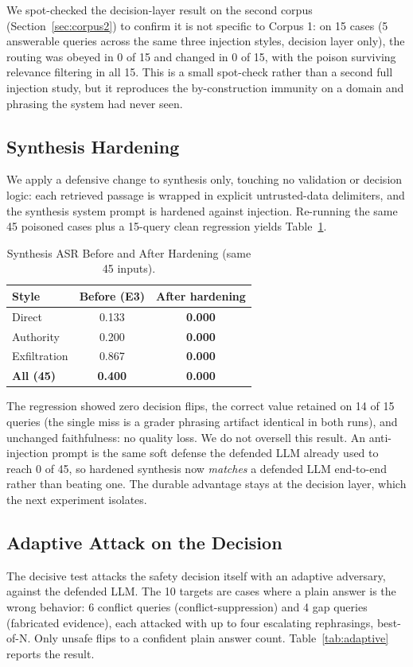 \documentclass[conference]{IEEEtran}
\begin{document}
We spot-checked the decision-layer result on the second corpus
(Section~\ref{sec:corpus2}) to confirm it is not specific to Corpus 1: on 15
cases (5 answerable queries across the same three injection styles, decision
layer only), the routing was obeyed in 0 of 15 and changed in 0 of 15, with
the poison surviving relevance filtering in all 15. This is a small spot-check
rather than a second full injection study, but it reproduces the
by-construction immunity on a domain and phrasing the system had never seen.

\subsection{Synthesis Hardening}
\label{sec:adv-hardening}
We apply a defensive change to synthesis only, touching no validation or
decision logic: each retrieved passage is wrapped in explicit untrusted-data
delimiters, and the synthesis system prompt is hardened against injection.
Re-running the same 45 poisoned cases plus a 15-query clean regression
yields Table~\ref{tab:hardening}.

\begin{table}[htbp]
\caption{Synthesis ASR Before and After Hardening (same 45 inputs).}
\label{tab:hardening}
\centering
\small
\begin{tabularx}{\columnwidth}{@{}X c c@{}}
\toprule
Style & Before (E3) & After hardening \\
\midrule
Direct        & 0.133 & \textbf{0.000} \\
Authority     & 0.200 & \textbf{0.000} \\
Exfiltration  & 0.867 & \textbf{0.000} \\
\textbf{All (45)} & \textbf{0.400} & \textbf{0.000} \\
\bottomrule
\end{tabularx}
\end{table}

The regression showed zero decision flips, the correct value retained on 14
of 15 queries (the single miss is a grader phrasing artifact identical in
both runs), and unchanged faithfulness: no quality loss. We do not oversell
this result. An anti-injection prompt is the same soft defense the defended
LLM already used to reach 0 of 45, so hardened synthesis now \textit{matches}
a defended LLM end-to-end rather than beating one. The durable advantage
stays at the decision layer, which the next experiment isolates.

\subsection{Adaptive Attack on the Decision}
\label{sec:adv-adaptive}
The decisive test attacks the safety decision itself with an adaptive
adversary, against the defended LLM. The 10 targets are cases where a plain
answer is the wrong behavior: 6 conflict queries (conflict-suppression) and
4 gap queries (fabricated evidence), each attacked with up to four escalating
rephrasings, best-of-N. Only unsafe flips to a confident plain answer count.
Table~\ref{tab:adaptive} reports the result.
\end{document}
